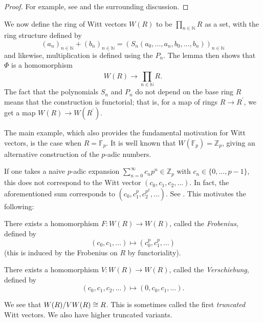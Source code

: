 \begin{proof}
	For example, see \cite[Theorem~2.6]{rabinoff-2014-witt-vec} and the 
	surrounding discussion.
\end{proof}

We now define the ring of Witt vectors 
\(W(R)\) to be 
\(\prod_{n \in \mathbb{N}}^{} R \) 
as a set, with the ring structure defined
by 
\[
	(a_{n})_{n \in \mathbb{N}} + 
	(b_{n})_{n \in \mathbb{N}} =
	(S_{n}(a_{0}, \ldots, a_{n}, b_{0}, \ldots, b_{n}))_{n \in \mathbb{N}}
\] 
and likewise, multiplication is defined
using the \(P_{n}\).
The lemma then shows that \(\Phi\) is a homomorphism 
\[
	W(R) \xrightarrow{} \prod_{n \in \mathbb{N}}^{} R 
.\] 
The fact that the polynomials \(S_{n}\) and \(P_{n}\) do not depend on the base
ring \(R\) means that the construction is functorial; that is,
for a map of rings \(R \xrightarrow{} R^{\prime} \), we get a 
map \(W(R) \xrightarrow{} W(R^{\prime})\).

The main example, which also provides the fundamental motivation
for Witt vectors, is the case when \(R = \mathbb{F}_{p}\).
It is well known that \(W(\mathbb{F}_{p}) = \mathbb{Z}_{p}\), 
giving an alternative construction of the \(p\)-adic numbers.

\begin{warn}
	If one takes a
    naive \(p\)-adic expansion 
    \(\sum_{n = 0}^{\infty} c_{n}p^{n} \in \mathbb{Z}_{p}\)
    with \(c_{n} \in \{0, \ldots, p-1\}\), this does not correspond
    to the Witt vector \((c_{0}, c_{1}, c_{2}, \ldots)\).
    In fact, the aforementioned sum corresponds to 
    \((c_{0}, c_{1}^{p}, c_{2}^{p^{2}}, \ldots)\). See
	\cite[Section~2]{kim-2017-witt-vec}. 
    This motivates the following: 
\end{warn}

\begin{defn}
	There exists a homomorphism \(F \colon W(R) \xrightarrow{} W(R)\),
	called the \textit{Frobenius},
	defined by
	\[
	 (c_{0}, c_{1}, \ldots) \mapsto (c_{0}^{p}, c_{1}^{p}, \ldots)
	\] 
    (this is induced by the Frobenius on \(R\) by functoriality).
\end{defn}

\begin{defn}
	There exists a homomorphism \(V \colon W(R) \xrightarrow{} W(R)\),
	called the \textit{Verschiebung},
	defined by
	\[
		(c_{0}, c_{1}, c_{2}, \ldots) \mapsto  (0, c_{0}, c_{1}, \ldots)
	.\] 
\end{defn}

We see that \(W(R) / VW(R) \cong R\).
This is sometimes called the first \textit{truncated}
Witt vectors.
We also have higher truncated variants.

